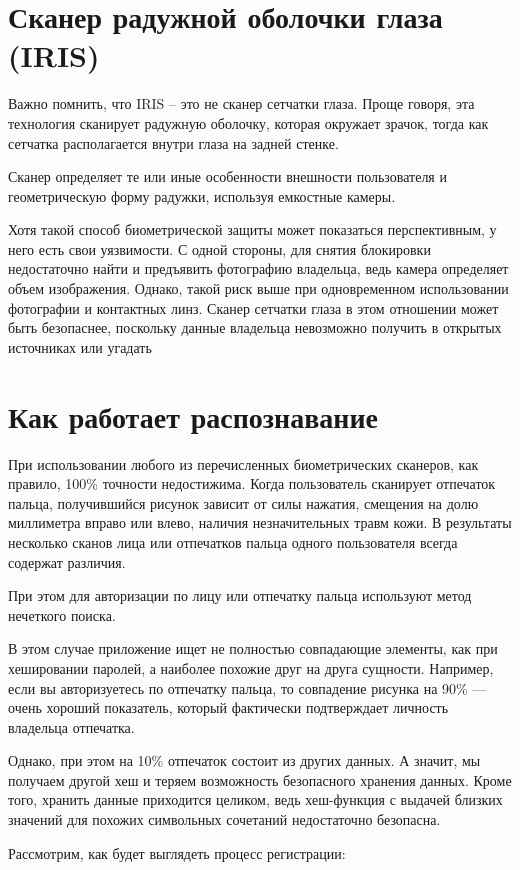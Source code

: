 \documentclass[a4paper,12pt]{extreport}
\begin{document}
\section{Сканер радужной оболочки глаза (IRIS)}
Важно помнить, что IRIS – это не сканер сетчатки глаза. Проще говоря, эта технология сканирует радужную оболочку, которая окружает зрачок, тогда как сетчатка располагается внутри глаза на задней стенке.

Сканер определяет те или иные особенности внешности пользователя и геометрическую форму радужки, используя емкостные камеры.

Хотя такой способ биометрической защиты может показаться перспективным, у него есть свои уязвимости. С одной стороны, для снятия блокировки недостаточно найти и предъявить фотографию владельца, ведь камера определяет объем изображения. Однако, такой риск выше при одновременном использовании фотографии и контактных линз. Сканер сетчатки глаза в этом отношении может быть безопаснее, поскольку данные владельца невозможно получить в открытых источниках или угадать

\section{Как работает распознавание}
При использовании любого из перечисленных биометрических сканеров, как правило, 100\% точности недостижима. Когда пользователь сканирует отпечаток пальца, получившийся рисунок зависит от силы нажатия, смещения на долю миллиметра вправо или влево, наличия незначительных травм кожи. В результаты несколько сканов лица или отпечатков пальца одного пользователя всегда содержат различия.

При этом для авторизации по лицу или отпечатку пальца используют метод нечеткого поиска.

В этом случае приложение ищет не полностью совпадающие элементы, как при хешировании паролей, а наиболее похожие друг на друга сущности. Например, если вы авторизуетесь по отпечатку пальца, то совпадение рисунка на 90\% — очень хороший показатель, который фактически подтверждает личность владельца отпечатка.

Однако, при этом на 10\% отпечаток состоит из других данных. А значит, мы получаем другой хеш и теряем возможность безопасного хранения данных. Кроме того, хранить данные приходится целиком, ведь хеш-функция с выдачей близких значений для похожих символьных сочетаний недостаточно безопасна.

Рассмотрим, как будет выглядеть процесс регистрации:
\end{document}
